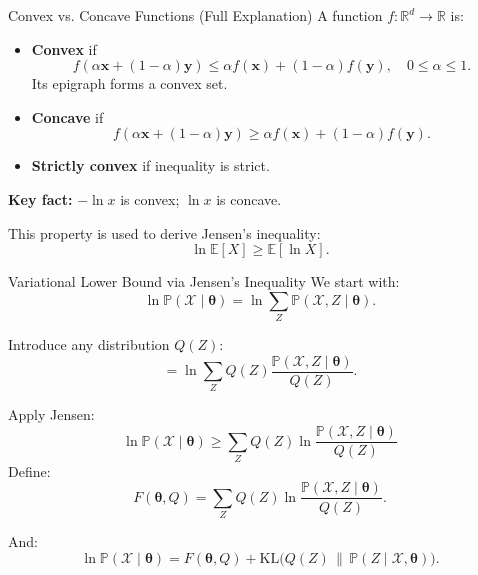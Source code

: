 \documentclass[serif, aspectratio=169]{beamer}
\begin{document}
\begin{frame}{Convex vs. Concave Functions (Full Explanation)}
A function $f:\mathbb{R}^d\rightarrow\mathbb{R}$ is:

\begin{itemize}
    \item \textbf{Convex} if  
    \[
    f(\alpha \mathbf{x} + (1-\alpha)\mathbf{y})
    \le
    \alpha f(\mathbf{x}) + (1-\alpha) f(\mathbf{y}),
    \quad 0\le\alpha\le1.
    \]
    Its epigraph forms a convex set.

    \item \textbf{Concave} if  
    \[
    f(\alpha \mathbf{x} + (1-\alpha)\mathbf{y})
    \ge
    \alpha f(\mathbf{x}) + (1-\alpha) f(\mathbf{y}).
    \]

    \item \textbf{Strictly convex} if inequality is strict.
\end{itemize}

\textbf{Key fact:} $-\ln x$ is convex;  
$\ln x$ is concave.  

This property is used to derive Jensen’s inequality:
\[
\ln \mathbb{E}[X]
\ge
\mathbb{E}[\ln X].
\]
\end{frame}

\begin{frame}{Variational Lower Bound via Jensen’s Inequality}
We start with:
\[
\ln \mathbb{P}(\mathcal{X}\mid\boldsymbol{\theta})
=
\ln
\sum_{Z}
\mathbb{P}(\mathcal{X}, Z \mid \boldsymbol{\theta}).
\]

Introduce any distribution $Q(Z)$:
\[
=
\ln
\sum_{Z}
Q(Z)
\frac{
\mathbb{P}(\mathcal{X}, Z\mid\boldsymbol{\theta})
}{
Q(Z)
}.
\]

Apply Jensen:
\[
\ln \mathbb{P}(\mathcal{X}\mid\boldsymbol{\theta})
\ge
\sum_Z
Q(Z)
\ln
\frac{
\mathbb{P}(\mathcal{X}, Z\mid\boldsymbol{\theta})
}{
Q(Z)
}
\]
Define:
\[
F(\boldsymbol{\theta},Q)
=
\sum_Z
Q(Z)
\ln
\frac{
\mathbb{P}(\mathcal{X}, Z\mid\boldsymbol{\theta})
}{
Q(Z)
}.
\]

And:
\[
\ln\mathbb{P}(\mathcal{X}\mid\boldsymbol{\theta})
=
F(\boldsymbol{\theta},Q)
+
\mathrm{KL}
\big(
Q(Z)
\,
\|\,
\mathbb{P}(Z\mid \mathcal{X},\boldsymbol{\theta})
\big).
\]
\end{frame}
\end{document}
